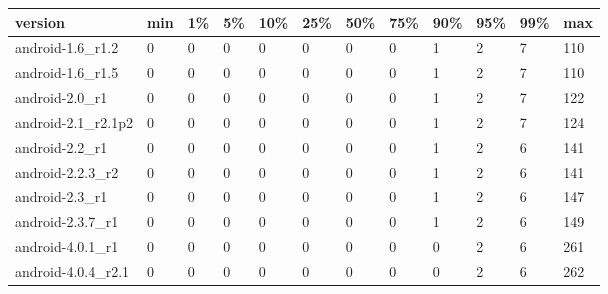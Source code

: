 \documentclass[a4paper]{article}
\begin{document}
\begin{tabular}{|l|l|l|l|l|l|l|l|l|l|l|l|}
\hline
version&min&1\%&5\%&10\%&25\%&50\%&75\%&90\%&95\%&99\%&max\\
\hline
android-1.6\_r1.2&0&0&0&0&0&0&0&1&2&7&110\\
\hline
android-1.6\_r1.5&0&0&0&0&0&0&0&1&2&7&110\\
\hline
android-2.0\_r1&0&0&0&0&0&0&0&1&2&7&122\\
\hline
android-2.1\_r2.1p2&0&0&0&0&0&0&0&1&2&7&124\\
\hline
android-2.2\_r1&0&0&0&0&0&0&0&1&2&6&141\\
\hline
android-2.2.3\_r2&0&0&0&0&0&0&0&1&2&6&141\\
\hline
android-2.3\_r1&0&0&0&0&0&0&0&1&2&6&147\\
\hline
android-2.3.7\_r1&0&0&0&0&0&0&0&1&2&6&149\\
\hline
android-4.0.1\_r1&0&0&0&0&0&0&0&0&2&6&261\\
\hline
android-4.0.4\_r2.1&0&0&0&0&0&0&0&0&2&6&262\\
\hline
\end{tabular}
\end{document}
